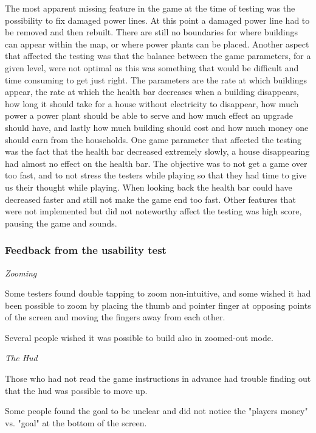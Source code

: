 	The most apparent missing feature in the game at the time of testing was the possibility 
	to fix damaged power lines. At this point a damaged power line had to be removed and then 
	rebuilt. There are still no boundaries for where buildings can appear within the map, or 
	where power plants can be placed. Another aspect that affected the testing was that the balance 
	between the game parameters, for a given level, were not optimal as this was something that 
	would be difficult and time consuming to get just right. The parameters are the rate at which 
	buildings appear, the rate at which the health bar decreases when a building disappears, 
	how long it should take for a house without electricity to disappear, how much power a power 
	plant should be able to serve and how much effect an upgrade should have, and lastly how much 
	building should cost and how much money one should earn from the households. One game parameter 
	that affected the testing was the fact that the health bar decreased extremely slowly, a house 
	disappearing had almost no effect on the health bar. The objective was to not get a game over too fast, 
	and to not stress the testers while playing so that they had time to give us their thought 
	while playing. When looking back the health bar could have decreased faster and still not 
	make the game end too fast. Other features that were not implemented but did not noteworthy 
	affect the testing was high score, pausing the game and sounds.

	\subsubsection*{Feedback from the usability test}

		\textit{Zooming}%

			Some testers found double tapping to zoom non-intuitive, and some wished it had 
			been possible to zoom by placing the thumb and pointer finger at opposing points 
			of the screen and moving the fingers away from each other.

			Several people wished it was possible to build also in zoomed-out mode.

		\textit{The Hud}

			Those who had not read the game instructions in advance had trouble finding out that 
			the hud was possible to move up.

			Some people found the goal to be unclear and did not notice the "players money" vs. "goal" at the bottom of the screen.

